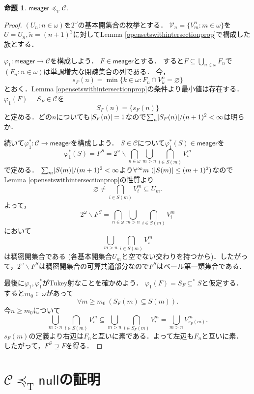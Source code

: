 \documentclass[uplatex,dvipdfmx]{jsarticle}
\newcommand{\scrC}{\mathcal{C}}
\newcommand{\tukeyle}{\preceq_\mathrm{T}}
\newcommand{\nul}{\mathsf{null}}
\newcommand{\meager}{\mathsf{meager}}
\DeclarePairedDelimiter\abs{\lvert}{\rvert}
\renewcommand\emptyset{\varnothing}
\renewcommand\subset{\subseteq}
\renewcommand{\setminus}{\smallsetminus}
\theoremstyle{definition}
\newtheorem{prop}[thm]{命題}
\theoremstyle{named}
\begin{document}
	\begin{prop}
		$\meager \tukeyle \scrC$.
	\end{prop}
	\begin{proof}
		$(U_n : n \in \omega)$を$2^\omega$の基本開集合の枚挙とする．
		$\mathcal{V}_n = \{V^n_m : m \in \omega \}$を$U = U_n, \tilde{n} = (n+1)^2$に対してLemma \ref{opensetswithintersectionprop}で構成した族とする．
		
		$\varphi_1 : \meager \to \scrC$を構成しよう．
		$F \in \meager$とする．
		すると$F \subseteq \bigcup_{n \in \omega} F_n$で$(F_n : n \in \omega)$は単調増大な閉疎集合の列である．
		今，
		\[s_F(n) = \min \{k \in \omega : F_n \cap V^n_k = \emptyset \}\]
		とおく．Lemma  \ref{opensetswithintersectionprop}の条件より最小値は存在する．
		$\varphi_1(F) = S_F \in \scrC$を
		\[
		S_F(n) = \{ s_F(n) \}
		\]
		と定める．どの$n$についても$\abs{S_F(n)} = 1$なので$\sum_n \abs{S_F(n)}/(n+1)^2 < \infty$は明らか．
		
		続いて$\varphi_1^*: \scrC \to \meager$を構成しよう．
		$S \in \scrC$について$\varphi_1^*(S) \in \meager$を
		\[
		\varphi_1^*(S) = F^S = 2^\omega \setminus \bigcap_{n \in \omega} \bigcup_{m > n} \bigcap_{i \in S(m)} V^m_i
		\]
		で定める．
		$\sum_m \abs{S(m)}/(m+1)^2 < \infty$より$\forall^\infty m\ ( \abs{S(m)}\le (m+1)^2)$なのでLemma \ref{opensetswithintersectionprop}の性質より
		\[
		\emptyset \ne \bigcap_{i \in S(m)} V^m_i \subset U_m.
		\]
		よって，
		\[
		2^\omega \setminus F^S =  \bigcap_{n \in \omega} \bigcup_{m > n} \bigcap_{i \in S(m)} V^m_i
		\]
		において
		\[
		\bigcup_{m > n} \bigcap_{i \in S(m)} V^m_i
		\]
		は稠密開集合である (各基本開集合$U_m$と空でない交わりを持つから)．したがって，$2^\omega \setminus F^S$は稠密開集合の可算共通部分なので$F^S$はベール第一類集合である．
		
		最後に$\varphi_1, \varphi_1^*$がTukey射なことを確かめよう．
		$\varphi_1(F) = S_F \subset^* S$と仮定する．
		すると$m_0 \in \omega$があって
		\[
		\forall m \ge m_0\ (S_F(m) \subset S(m)).
		\]
		今$n \ge m_0$について
		\[
		\bigcup_{m > n} \bigcap_{i \in S(m)} V^m_i \subset \bigcup_{m > n} \bigcap_{i \in S_F(m)} V^m_i = \bigcup_{m > n} V^m_{s_F(m)}.
		\]
		$s_F(m)$の定義より右辺は$F_n$と互いに素である．よって左辺も$F_n$と互いに素．
		したがって，$F^S \supseteq F$を得る．
		\end{proof}
	
	\section{$\scrC \tukeyle \nul$の証明}
	
\end{document}

